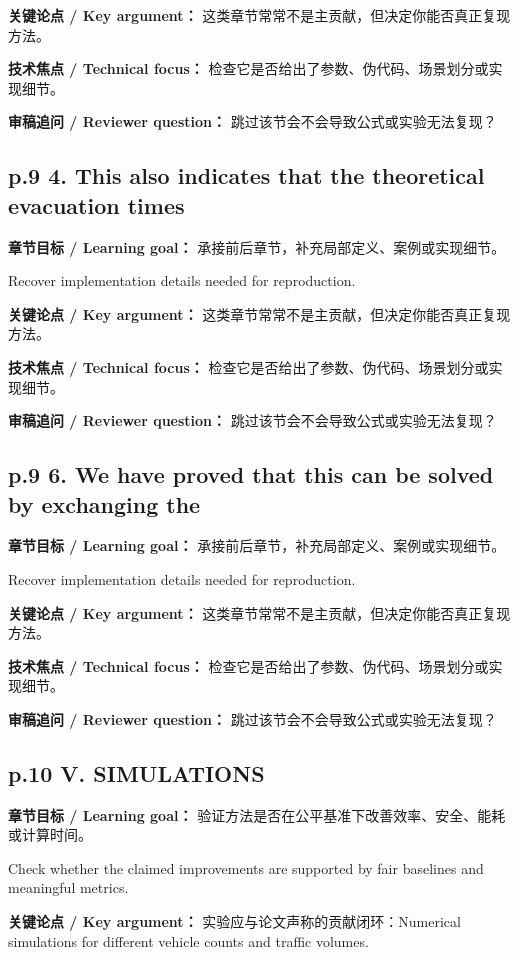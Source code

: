 \documentclass[UTF8,a4paper,11pt,fontset=fandol]{ctexart}
\begin{document}
\textbf{关键论点 / Key argument：} 这类章节常常不是主贡献，但决定你能否真正复现方法。

\textbf{技术焦点 / Technical focus：} 检查它是否给出了参数、伪代码、场景划分或实现细节。

\textbf{审稿追问 / Reviewer question：} 跳过该节会不会导致公式或实验无法复现？

\subsection*{p.9 4. This also indicates that the theoretical evacuation times}
\textbf{章节目标 / Learning goal：} 承接前后章节，补充局部定义、案例或实现细节。

Recover implementation details needed for reproduction.

\textbf{关键论点 / Key argument：} 这类章节常常不是主贡献，但决定你能否真正复现方法。

\textbf{技术焦点 / Technical focus：} 检查它是否给出了参数、伪代码、场景划分或实现细节。

\textbf{审稿追问 / Reviewer question：} 跳过该节会不会导致公式或实验无法复现？

\subsection*{p.9 6. We have proved that this can be solved by exchanging the}
\textbf{章节目标 / Learning goal：} 承接前后章节，补充局部定义、案例或实现细节。

Recover implementation details needed for reproduction.

\textbf{关键论点 / Key argument：} 这类章节常常不是主贡献，但决定你能否真正复现方法。

\textbf{技术焦点 / Technical focus：} 检查它是否给出了参数、伪代码、场景划分或实现细节。

\textbf{审稿追问 / Reviewer question：} 跳过该节会不会导致公式或实验无法复现？

\subsection*{p.10 V. SIMULATIONS}
\textbf{章节目标 / Learning goal：} 验证方法是否在公平基准下改善效率、安全、能耗或计算时间。

Check whether the claimed improvements are supported by fair baselines and meaningful metrics.

\textbf{关键论点 / Key argument：} 实验应与论文声称的贡献闭环：Numerical simulations for different vehicle counts and traffic volumes.
\end{document}
